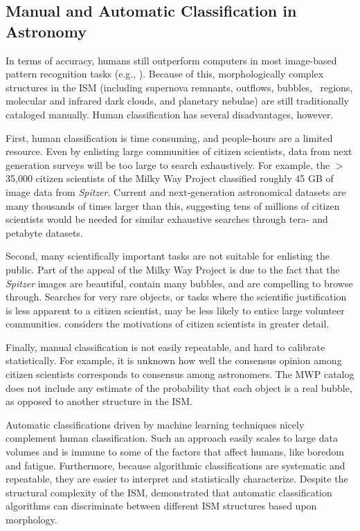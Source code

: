 \subsection{Manual and Automatic Classification in Astronomy}
\label{sec:benefits}

In terms of accuracy, humans still outperform computers in most image-based pattern recognition tasks (e.g., \citealt{Zhang10}). Because of this, morphologically complex structures in the ISM (including supernova remnants, outflows, bubbles, \hii\, regions, molecular and infrared dark clouds, and planetary nebulae) are still traditionally cataloged manually. Human classification has several disadvantages, however.

First, human classification is time consuming, and people-hours are a limited resource. Even by enlisting large communities of citizen scientists, data from next generation surveys will be too large to search exhaustively. For example, the $>$ 35,000 citizen scientists of the Milky Way Project classified roughly 45 GB of image data from \emph{Spitzer}. Current and next-generation astronomical datasets are many thousands of times larger than this, suggesting tens of millions of citizen scientists would be needed for similar exhaustive searches through tera- and petabyte datasets.

Second, many scientifically important tasks are not suitable for enlisting the public. Part of the appeal of the Milky Way Project is due to the fact that the \emph{Spitzer} images are beautiful, contain many bubbles, and are compelling to browse through. Searches for very rare objects, or tasks where the scientific justification is less apparent to a citizen scientist, may be less likely to entice large volunteer communities. \cite{Raddick13} considers the motivations of citizen scientists in greater detail.

Finally, manual classification is not easily repeatable, and hard to calibrate statistically. For example, it is unknown how well the consensus opinion among citizen scientists corresponds to consensus among astronomers. The MWP catalog does not include any estimate of the probability that each object is a real bubble, as opposed to another structure in the ISM.

Automatic classifications driven by machine learning techniques nicely complement human classification. Such an approach easily scales to large data volumes and is immune to some of the factors that affect humans, like boredom and fatigue. Furthermore, because algorithmic classifications are systematic and repeatable, they are easier to interpret and statistically characterize. Despite the structural complexity of the ISM, \cite{Beaumont11} demonstrated that automatic classification algorithms can discriminate between different ISM structures based upon morphology.

